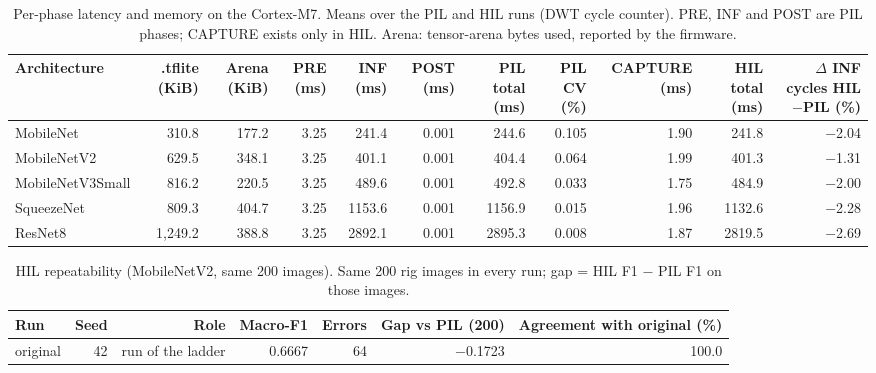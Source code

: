 \begin{table}[htbp]
\centering
\scriptsize
\caption{Per-phase latency and memory on the Cortex-M7. Means over the PIL and HIL runs (DWT cycle counter). PRE, INF and POST are PIL phases; CAPTURE exists only in HIL. Arena: tensor-arena bytes used, reported by the firmware.}
\label{tab:ladder-coco-3}
\begin{tabular}{lrrrrrrrrrr}
\toprule
Architecture & .tflite (KiB) & Arena (KiB) & PRE (ms) & INF (ms) & POST (ms) & PIL total (ms) & PIL CV (\%) & CAPTURE (ms) & HIL total (ms) & $\Delta$ INF cycles HIL$-$PIL (\%) \\
\midrule
MobileNet & 310.8 & 177.2 & 3.25 & 241.4 & 0.001 & 244.6 & 0.105 & 1.90 & 241.8 & $-$2.04 \\
MobileNetV2 & 629.5 & 348.1 & 3.25 & 401.1 & 0.001 & 404.4 & 0.064 & 1.99 & 401.3 & $-$1.31 \\
MobileNetV3Small & 816.2 & 220.5 & 3.25 & 489.6 & 0.001 & 492.8 & 0.033 & 1.75 & 484.9 & $-$2.00 \\
SqueezeNet & 809.3 & 404.7 & 3.25 & 1153.6 & 0.001 & 1156.9 & 0.015 & 1.96 & 1132.6 & $-$2.28 \\
ResNet8 & 1,249.2 & 388.8 & 3.25 & 2892.1 & 0.001 & 2895.3 & 0.008 & 1.87 & 2819.5 & $-$2.69 \\
\bottomrule
\end{tabular}
\end{table}

\begin{table}[htbp]
\centering
\scriptsize
\caption{HIL repeatability (MobileNetV2, same 200 images). Same 200 rig images in every run; gap = HIL F1 $-$ PIL F1 on those images.}
\label{tab:ladder-coco-4}
\begin{tabular}{lrrrrrr}
\toprule
Run & Seed & Role & Macro-F1 & Errors & Gap vs PIL (200) & Agreement with original (\%) \\
\midrule
original & 42 & run of the ladder & 0.6667 & 64 & $-$0.1723 & 100.0 \\
\bottomrule
\end{tabular}
\end{table}

